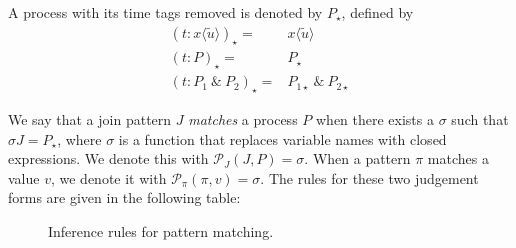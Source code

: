 A process with its time tags removed is denoted by $P_{\star}$, defined by
\begin{align*}
  (t : x\langle \tilde u \rangle)_\star ={}& x\langle \tilde u \rangle \\
  (t : P)_\star ={}& P_\star \\
  (t : P_1~\&~P_2)_\star ={}& P_{1\star} ~\&~ P_{2\star}
\end{align*}

We say that a join pattern $J$ \emph{matches} a process $P$ when there exists a
$\sigma$ such that $\sigma J = P_\star$, where $\sigma$ is a function that
replaces variable names with closed expressions. We denote this with
$\mathcal{P}_J(J,P) = \sigma$. When a pattern $\pi$ matches a value $v$, we
denote it with $\mathcal{P}_\pi(\pi,v) = \sigma$. The rules for these two
judgement forms are given in the following table:
\begin{figure}[!h]
\caption{Inference rules for pattern matching.} \label{fig:rule:pat}
\end{figure}

